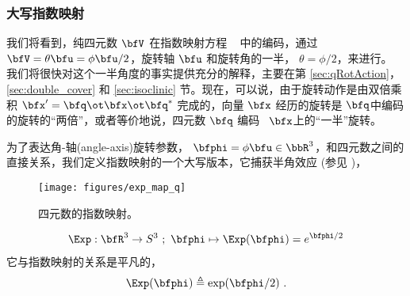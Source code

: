 \subsubsection{大写指数映射}

我们将看到，纯四元数 $\bfV$ 在指数映射方程 ~ 中的编码，通过 $\bfV=\theta\bfu = \phi\bfu/2$，旋转轴 $\bfu$ 和旋转角的一半， $\theta=\phi/2$，来进行。
我们将很快对这个一半角度的事实提供充分的解释，主要在第 \ref{sec:qRotAction}， \ref{sec:double_cover} 和 \ref{sec:isoclinic} 节。现在，可以说，由于旋转动作是由双倍乘积 $\bfx'=\bfq\ot\bfx\ot\bfq^*$ 完成的，向量 $\bfx$ 经历的旋转是 $\bfq$中编码的旋转的“两倍”，或者等价地说，四元数 $\bfq$ 编码 ~$\bfx$上的“一半”旋转。

为了表达角-轴(angle-axis)旋转参数， $\bfphi=\phi\bfu\in\bbR^3$，和四元数之间的直接关系，我们定义指数映射的一个大写版本，它捕获半角效应 (参见 )，
%
\begin{figure}[tb]
\begin{center}
\texttt{[image: figures/exp\_map\_q]}
\caption{四元数的指数映射。}
\label{fig:exp_map_q}
\end{center}
\end{figure}
%
\begin{align}
\Exp:\bfR^3\to S^3~;~\bfphi\mapsto\Exp(\bfphi)=e^{\bfphi/2}
\end{align}
%
它与指数映射的关系是平凡的，
%
\begin{align}
\Exp(\bfphi) \triangleq \exp(\bfphi/2)
~.
\end{align}


